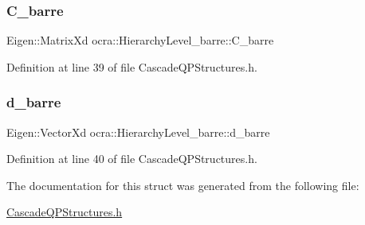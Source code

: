 \subsubsection{\texorpdfstring{C\+\_\+barre}{C\_barre}}
{\footnotesize\ttfamily Eigen\+::\+Matrix\+Xd ocra\+::\+Hierarchy\+Level\+\_\+barre\+::\+C\+\_\+barre}



Definition at line 39 of file Cascade\+Q\+P\+Structures.\+h.

\hypertarget{structocra_1_1HierarchyLevel__barre_a65cc4a8fa90c825809493c2bbc921a3d}{}\label{structocra_1_1HierarchyLevel__barre_a65cc4a8fa90c825809493c2bbc921a3d} 
\subsubsection{\texorpdfstring{d\+\_\+barre}{d\_barre}}
{\footnotesize\ttfamily Eigen\+::\+Vector\+Xd ocra\+::\+Hierarchy\+Level\+\_\+barre\+::d\+\_\+barre}



Definition at line 40 of file Cascade\+Q\+P\+Structures.\+h.



The documentation for this struct was generated from the following file\+:\begin{DoxyCompactItemize}
\item 
\hyperlink{CascadeQPStructures_8h}{Cascade\+Q\+P\+Structures.\+h}\end{DoxyCompactItemize}
